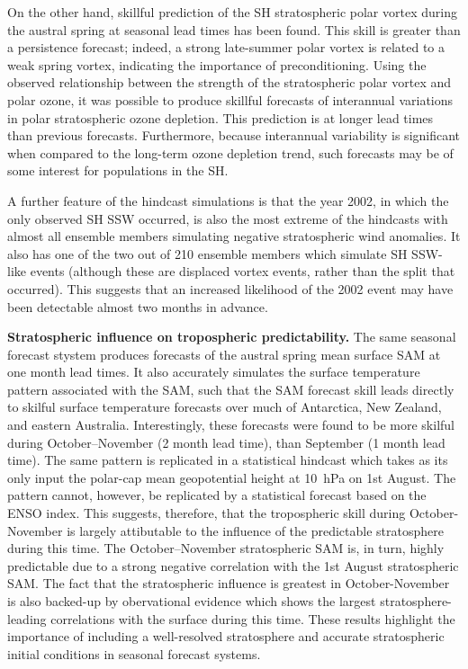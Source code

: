 On the other hand, skillful prediction of the SH stratospheric polar vortex
during the austral spring at seasonal lead times has been found. This skill is
greater than a persistence forecast; indeed, a strong late-summer polar vortex
is related to a weak spring vortex, indicating the importance of
preconditioning. Using the observed relationship between the strength of the
stratospheric polar vortex and polar ozone, it was possible to produce skillful
forecasts of interannual variations in polar stratospheric ozone depletion. This
prediction is at longer lead times than previous forecasts. Furthermore, because
interannual variability is significant when compared to the long-term ozone
depletion trend, such forecasts may be of some interest for populations in the
SH.

A further feature of the hindcast simulations is that the year 2002, in which
the only observed SH SSW occurred, is also the most extreme of the hindcasts
with almost all ensemble members simulating negative stratospheric wind
anomalies. It also has one of the two out of 210 ensemble members which simulate
SH SSW-like events (although these are displaced vortex events, rather than the
split that occurred). This suggests that an increased likelihood of the 2002
event may have been detectable almost two months in advance.

\bigskip\noindent\textbf{Stratospheric influence on tropospheric
  predictability.} The same seasonal forecast stystem produces forecasts of the
austral spring mean surface SAM at one month lead times. It also accurately
simulates the surface temperature pattern associated with the SAM, such that the
SAM forecast skill leads directly to skilful surface temperature forecasts over
much of Antarctica, New Zealand, and eastern Australia. Interestingly, these
forecasts were found to be more skilful during October--November (2 month lead
time), than September (1 month lead time). The same pattern is replicated in a
statistical hindcast which takes as its only input the polar-cap mean
geopotential height at 10~hPa on 1st August. The pattern cannot, however, be
replicated by a statistical forecast based on the ENSO index. This suggests,
therefore, that the tropospheric skill during October-November is largely
attibutable to the influence of the predictable stratosphere during this
time. The October--November stratospheric SAM is, in turn, highly predictable due
to a strong negative correlation with the 1st August stratospheric SAM. The fact
that the stratospheric influence is greatest in October-November is also
backed-up by obervational evidence which shows the largest stratosphere-leading
correlations with the surface during this time. These results highlight the
importance of including a well-resolved stratosphere and accurate stratospheric
initial conditions in seasonal forecast systems. 

